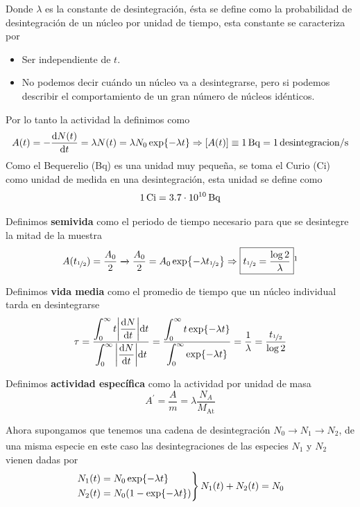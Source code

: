 Donde $\lambda$ es la constante de desintegración, ésta se define como la probabilidad de desintegración de un núcleo por unidad de tiempo, esta constante se caracteriza por 
\newpage
\begin{itemize}
    \item Ser independiente de $t$.
    \item No podemos decir cuándo un núcleo va a desintegrarse, pero si podemos describir el comportamiento de un gran número de núcleos idénticos.
\end{itemize}
Por lo tanto la actividad la definimos como 
\begin{equation}
    A(t)=-\dv{N(t)}{t}=\lambda N(t) =\lambda N_0 \exp{-\lambda t}\Rightarrow [A(t)]\equiv \unit[1]{Bq}=\unit[1]{desintegracion/s}
    \label{eq: actividad radiactiva}
\end{equation}
Como el Bequerelio (Bq) es una unidad muy pequeña, se toma el Curio (Ci) como unidad de medida en una desintegración, esta unidad se define como $$\unit[1]{Ci}=\unit[3.7\cdot 10^{10}]{Bq}$$

Definimos \textbf{semivida} como el periodo de tiempo necesario para que se desintegre la mitad de la muestra
\begin{equation}
    A(t_{\nicefrac{1}{2}})=\frac{A_0}{2} \xrightarrow{} \frac{A_0}{2}=A_0\exp{-\lambda t_{\nicefrac{1}{2}}} \Rightarrow \boxed{t_{\nicefrac{1}{2}}=\frac{\log 2}{\lambda}} \footnotemark
    \label{eq: semivida}
\end{equation}

Definimos \textbf{vida media} como el promedio de tiempo  que un núcleo individual tarda en desintegrarse
\begin{equation}
    \tau=\displaystyle \dfrac{ \displaystyle\int_0^\infty t \abs{\dv{N}{t}}\dd t}{ \displaystyle\int_0^\infty  \abs{\dv{N}{t}}\dd t}= \dfrac{ \displaystyle \int^\infty_0 t \exp{-\lambda t}}{ \displaystyle\int^\infty_0  \exp{-\lambda t}}=\frac{1}{\lambda}=\frac{t_{\nicefrac{1}{2}}}{\log 2}
    \label{eq: Vida media}
\end{equation}

Definimos \textbf{actividad específica} como la actividad por unidad de masa
\begin{equation}
    A^\prime =\frac{A}{m}=\lambda \frac{N_A}{M_\mathrm{At}}
    \label{eq: activida especifica}
\end{equation}

Ahora supongamos que tenemos una cadena de desintegración $N_0\xrightarrow[]{} N_1\xrightarrow[]{} N_2$, de una misma especie en este caso las desintegraciones de las especies $N_1$ y $N_2$ vienen dadas por 
\begin{equation*}
     \left. \begin{aligned}
        &N_1(t)=N_0\exp{-\lambda t}\\
        &N_2(t)=N_0\qty(1-\exp{-\lambda t})
    \end{aligned} \right \} N_1(t)+N_2(t)=N_0
\end{equation*}

